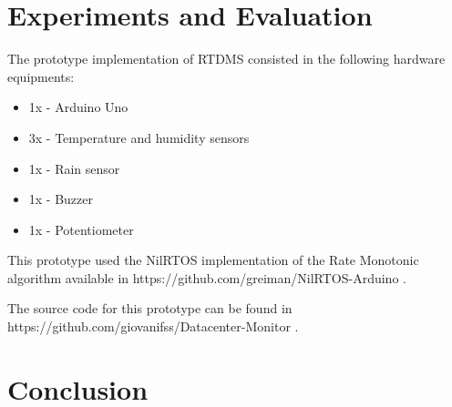 \documentclass[12pt]{article}
\begin{document}
\section{Experiments and Evaluation}

The prototype implementation of RTDMS consisted in the following hardware equipments:
\begin{itemize}
 \item 1x - Arduino Uno
 \item 3x - Temperature and humidity sensors
 \item 1x - Rain sensor
 \item 1x - Buzzer
 \item 1x - Potentiometer
\end{itemize}

This prototype used the NilRTOS implementation of the Rate Monotonic algorithm available in 
https://github.com/greiman/NilRTOS-Arduino .

The source code for this prototype can be found in https://github.com/giovanifss/Datacenter-Monitor .

\section{Conclusion}



\end{document}
